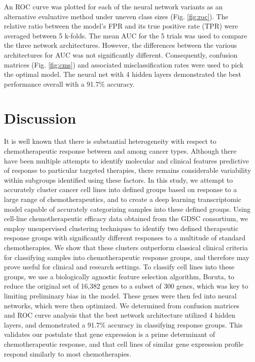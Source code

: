 \documentclass[10pt, letterpaper]{article}
\begin{document}
\begin{multicols*}{2}
An ROC curve was plotted for each of the neural network variants as an alternative evaluative method under uneven class sizes (Fig. \ref{fig:roc}). The relative ratio between the model’s FPR and its true positive rate (TPR) were averaged between 5 k-folds. The mean AUC for the 5 trials was used to compare the three network architectures. However, the differences between the various architectures for AUC was not significantly different. Consequently, confusion matrices (Fig. \ref{fig:cms}) and associated misclassification rates were used to pick the optimal model. The neural net with 4 hidden layers demonstrated the best performance overall with a 91.7\% accuracy.


\section{Discussion}
It is well known that there is substantial heterogeneity with respect to chemotherapeutic response between and among cancer types. Although there have been multiple attempts to identify molecular and clinical features predictive of response to particular targeted therapies, there remains considerable variability within subgroups identified using these factors. In this study, we attempt to accurately cluster cancer cell lines into defined groups based on response to a large range of chemotherapeutics, and to create a deep learning transcriptomic model capable of accurately categorizing samples into these defined groups. Using cell-line chemotherapeutic efficacy data obtained from the GDSC consortium, we employ unsupervised clustering techniques to identify two defined therapeutic response groups with significantly different responses to a multitude of standard chemotherapies. We show that these clusters outperform classical clinical criteria for classifying samples into chemotherapeutic response groups, and therefore may prove useful for clinical and research settings. To classify cell lines into these groups, we use a biologically agnostic feature selection algorithm, Boruta, to reduce the original set of 16,382 genes to a subset of 300 genes, which was key to limiting preliminary bias in the model. These genes were then fed into neural networks, which were then optimized. We determined from confusion matrices and ROC curve analysis that the best network architecture utilized 4 hidden layers, and demonstrated a 91.7\% accuracy in classifying response groups. This validates our postulate that gene expression is a prime determinant of chemotherapeutic response, and that cell lines of similar gene expression profile respond similarly to most chemotherapies.


\end{multicols*}
\end{document}
